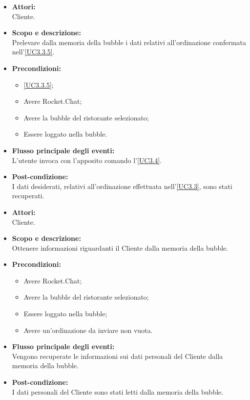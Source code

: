 
\begin{itemize}
	\item \textbf{Attori:}
	\\Cliente.
	\item \textbf{Scopo e descrizione:} 
	\\Prelevare dalla memoria della bubble i dati relativi all'ordinazione confermata nell'\ref{UC3.3.5}.
	\item \textbf{Precondizioni:}
	\begin{itemize}
		\item \ref{UC3.3.5};
		\item Avere Rocket.Chat;
		\item Avere la bubble del ristorante selezionato;
		\item Essere loggato nella bubble.
	\end{itemize}
	\item \textbf{Flusso principale degli eventi:}
	\\L'utente invoca con l'apposito comando l'\ref{UC3.4}.
	\item \textbf{Post-condizione:}
	\\I dati desiderati, relativi all'ordinazione effettuata nell'\ref{UC3.3}, sono stati recuperati. 
\end{itemize}


\begin{itemize}
	\item \textbf{Attori:}
	\\Cliente.
	\item \textbf{Scopo e descrizione:} 
	\\Ottenere informazioni riguardanti il Cliente dalla memoria della bubble.
	\item \textbf{Precondizioni:}
	\begin{itemize}
		\item Avere Rocket.Chat;
		\item Avere la bubble del ristorante selezionato;
		\item Essere loggato nella bubble;
		\item Avere un'ordinazione da inviare non vuota.
	\end{itemize}
	\item \textbf{Flusso principale degli eventi:}
	\\Vengono recuperate le informazioni sui dati personali del Cliente dalla memoria della bubble.
	\item \textbf{Post-condizione:}
	\\I dati personali del Cliente sono stati letti dalla memoria della bubble.
\end{itemize}


